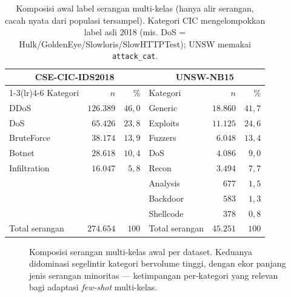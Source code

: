 \documentclass[11pt,a4paper]{article}
\begin{document}
\begin{table}[h]
\centering
\caption{Komposisi awal label serangan multi-kelas (hanya alir serangan, cacah
nyata dari populasi tersampel). Kategori CIC mengelompokkan label asli 2018
(mis. DoS = Hulk/GoldenEye/Slowloris/SlowHTTPTest); UNSW memakai \texttt{attack\_cat}.}
\label{tab:attackcomp}
\small
\begin{tabular}{lr r @{\hskip 2em} lr r}
\toprule
\multicolumn{3}{c}{CSE-CIC-IDS2018} & \multicolumn{3}{c}{UNSW-NB15} \\
\cmidrule(lr){1-3}\cmidrule(lr){4-6}
Kategori & $n$ & \% & Kategori & $n$ & \% \\
\midrule
DDoS         & $126{.}389$ & $46{,}0$ & Generic   & $18{.}860$ & $41{,}7$ \\
DoS          & $65{.}426$  & $23{,}8$ & Exploits  & $11{.}125$ & $24{,}6$ \\
BruteForce   & $38{.}174$  & $13{,}9$ & Fuzzers   & $6{.}048$  & $13{,}4$ \\
Botnet       & $28{.}618$  & $10{,}4$ & DoS       & $4{.}086$  & $9{,}0$  \\
Infiltration & $16{.}047$  & $5{,}8$  & Recon     & $3{.}494$  & $7{,}7$  \\
             &             &          & Analysis  & $677$      & $1{,}5$  \\
             &             &          & Backdoor  & $583$      & $1{,}3$  \\
             &             &          & Shellcode & $378$      & $0{,}8$  \\
\midrule
Total serangan & $274{.}654$ & $100$ & Total serangan & $45{.}251$ & $100$ \\
\bottomrule
\end{tabular}
\end{table}

\begin{figure}[h]
\centering
\resizebox{0.95\linewidth}{!}{}
\caption{Komposisi serangan multi-kelas awal per dataset. Keduanya didominasi
segelintir kategori bervolume tinggi, dengan ekor panjang jenis serangan minoritas
--- ketimpangan per-kategori yang relevan bagi adaptasi \emph{few-shot} multi-kelas.}
\label{fig:attackcomp}
\end{figure}
\end{document}
